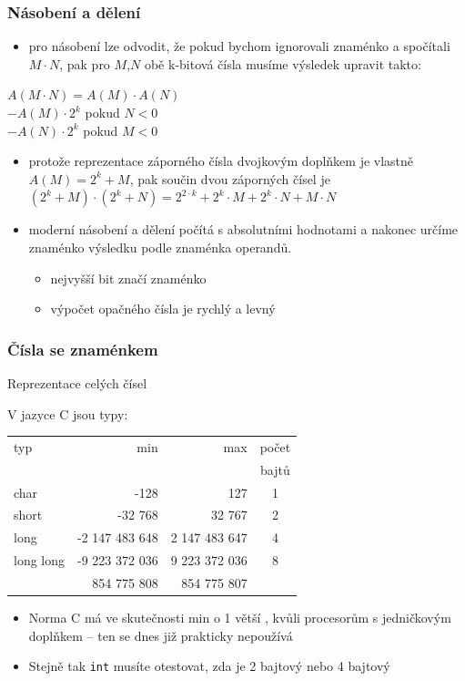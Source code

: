 \begin{frame}
\frametitle{Násobení a dělení}

\begin{itemize}
\item pro násobení lze odvodit, že pokud bychom ignorovali znaménko a spočítali $M\cdot N$, pak pro $M$,$N$ obě k-bitová čísla musíme výsledek upravit takto:
\end{itemize}
$A(M\cdot N) = A(M) \cdot A(N)$\\
\phantom{$A(M\cdot N)$ }$-A(M) \cdot 2^k$ \phantom{xxxxx} pokud $N<0$\\
\phantom{$A(M\cdot N)$ }$-A(N) \cdot 2^k$ \phantom{xxxxx} pokud $M<0$
\begin{itemize}
\item protože reprezentace záporného čísla dvojkovým doplňkem je vlastně $A(M) = 2^k+M$, pak součin dvou záporných čísel je $(2^k+M)\cdot (2^k+N) = 2^{2\cdot k}+2^k \cdot M + 2^k \cdot N + M \cdot N$
\end{itemize}
\begin{itemize}
\item moderní násobení a dělení počítá s absolutními hodnotami a nakonec určíme znaménko výsledku podle znaménka operandů.
\begin{itemize}
\item nejvyšší bit značí znaménko
\item výpočet opačného čísla je rychlý a levný
\end{itemize}
\end{itemize}
\end{frame}


\begin{frame}
\frametitle{Čísla se znaménkem}
Reprezentace celých čísel

V jazyce C jsou typy:
\begin{tabular}{|l|r|r|c|}\hline
typ & min & max & počet\\
 &  & &  bajtů\\ \hline
char & -128 & 127 & 1 \\ \hline
short & -32 768 & 32 767 & 2 \\ \hline 
long & -2 147 483 648 & 2 147 483 647 & 4 \\ \hline
long long & -9 223 372 036 & 9 223 372 036  & 8 \\ 
 & \phantom{xx} 854 775 808 & \phantom{xx}854 775 807 &  \\ \hline
\end{tabular}

\begin{itemize}
\item Norma C má ve skutečnosti min o 1 větší , kvůli procesorům s jedničkovým doplňkem -- ten se dnes již prakticky nepoužívá
\item Stejně tak \texttt{int} musíte otestovat, zda je 2 bajtový nebo 4 bajtový
\end{itemize}

\end{frame}


